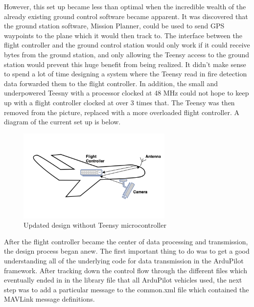 \documentclass[12pt,journal,compsoc]{IEEEtran}
\begin{document}
However, this set up became less than optimal when the incredible wealth of the already existing ground control software became apparent. It was discovered that the ground station software, Mission Planner, could be used to send GPS waypoints to the plane which it would then track to. The interface between the flight controller and the ground control station would only work if it could receive bytes from the ground station, and only allowing the Teensy access to the ground station would prevent this huge benefit from being realized. 
It didn't make sense to spend a lot of time designing a system where the Teensy read in fire detection data forwarded them to the flight controller. In addition, the small and underpowered Teesny with a processor clocked at 48 MHz could not hope to keep up with a flight controller clocked at over 3 times that. The Teensy was then removed from the picture, replaced with a more overloaded flight controller. A diagram of the current set up is below.
\begin{figure}[h!]
\hspace*{0cm}
\centering
\includegraphics[width=3in]{Version2.png}
\caption{Updated design without Teensy microcontroller}
\label{version2}
\end{figure}

After the flight controller became the center of data processing and transmission, the design process began anew. The first important thing to do was to get a good understanding all of the underlying code for data transmission in the ArduPilot framework. After tracking down the control flow through the different files which eventually ended in in the library file that all ArduPilot vehicles used, the next step was to add a particular message to the common.xml file which contained the MAVLink message definitions. 
\end{document}
